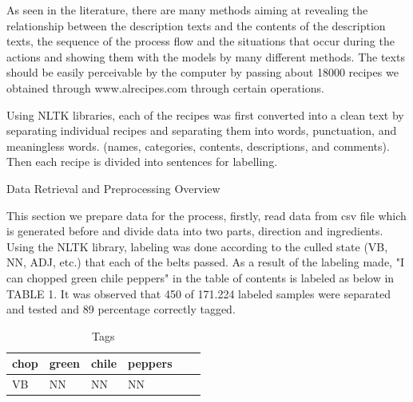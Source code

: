 As seen in the literature, there are many methods aiming at revealing the relationship between the description texts and the contents of the description texts, the sequence of the process flow and the situations that occur during the actions and showing them with the models by many different methods. The texts should be easily perceivable by the computer by passing about 18000 recipes we obtained through www.alrecipes.com through certain operations.

Using NLTK\cite{nltk} libraries, each of the recipes was first converted into a clean text by separating individual recipes and separating them into words, punctuation, and meaningless words.  (names, categories, contents, descriptions, and comments). Then each recipe is divided into sentences for labelling.

\begin{algorithm}
\caption{Data Retrieval and Preprocessing Overview}
\label{alg:generator}

\end{algorithm}

This section we prepare data for the process, firstly, read data from csv file which is generated before and divide data into two parts, direction and ingredients. Using the NLTK \cite{nltk} library, labeling was done according to the culled state (VB, NN, ADJ, etc.) that each of the belts passed. As a result of the labeling made, "I can chopped green chile peppers" in the table of contents is labeled as below in TABLE 1. It was observed that 450 of 171.224 labeled samples were separated and tested and 89 percentage correctly tagged.

\begin{table}[]
\centering
\caption{Tags}
\label{my-label}
\begin{tabular}{|l|l|l|l|l|l|}
\hline
 chop & green & chile & peppers \\ \hline
 VB      & NN    & NN    & NN      \\ \hline
\end{tabular}
\end{table}

